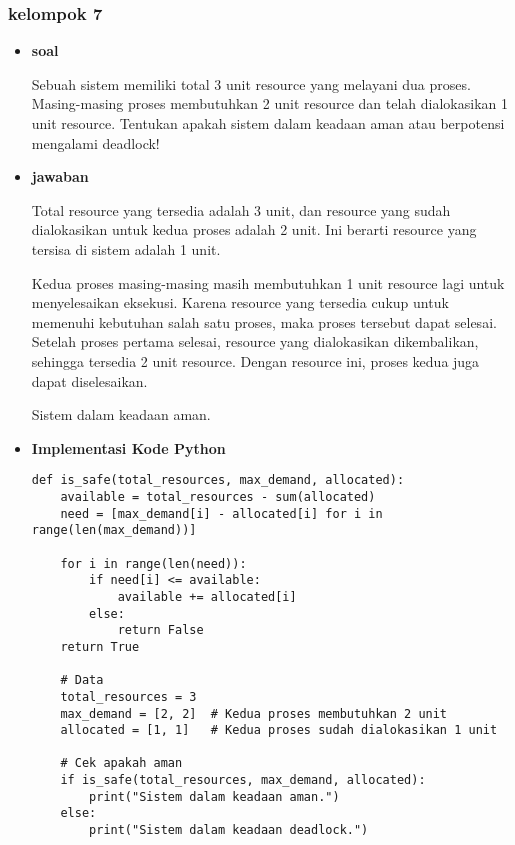 \documentclass[12pt]{article}
\begin{document}
\subsubsection{kelompok 7}
\begin{itemize}
    \item\textbf{soal}
    \par\hspace{2em}Sebuah sistem memiliki total 3 unit resource yang melayani dua proses. Masing-masing proses membutuhkan 2 unit resource dan telah dialokasikan 1 unit resource. Tentukan apakah sistem dalam keadaan aman atau berpotensi mengalami deadlock!
    
    \item\textbf{jawaban}
    \par\hspace{2em}Total resource yang tersedia adalah 3 unit, dan resource yang sudah dialokasikan untuk kedua proses adalah 2 unit. Ini berarti resource yang tersisa di sistem adalah 1 unit.
    \par\hspace{2em}Kedua proses masing-masing masih membutuhkan 1 unit resource lagi untuk menyelesaikan eksekusi. Karena resource yang tersedia cukup untuk memenuhi kebutuhan salah satu proses, maka proses tersebut dapat selesai. Setelah proses pertama selesai, resource yang dialokasikan dikembalikan, sehingga tersedia 2 unit resource. Dengan resource ini, proses kedua juga dapat diselesaikan.
    \par Sistem dalam keadaan aman.

     \item\textbf{Implementasi Kode Python}
         \lstset{style=ystyle}
    \begin{lstlisting}def is_safe(total_resources, max_demand, allocated):
    available = total_resources - sum(allocated)
    need = [max_demand[i] - allocated[i] for i in range(len(max_demand))]

    for i in range(len(need)):
        if need[i] <= available:
            available += allocated[i]
        else:
            return False
    return True

    # Data
    total_resources = 3
    max_demand = [2, 2]  # Kedua proses membutuhkan 2 unit
    allocated = [1, 1]   # Kedua proses sudah dialokasikan 1 unit

    # Cek apakah aman
    if is_safe(total_resources, max_demand, allocated):
        print("Sistem dalam keadaan aman.")
    else:
        print("Sistem dalam keadaan deadlock.")
    \end{lstlisting}
    
\end{itemize}
\end{document}

